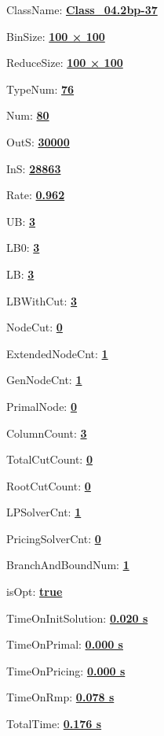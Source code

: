 \documentclass[11pt]{article}
\begin{document}
\pagestyle{empty}


ClassName: \underline{\textbf{Class_04.2bp-37}}
\par
BinSize: \underline{\textbf{100 × 100}}
\par
ReduceSize: \underline{\textbf{100 × 100}}
\par
TypeNum: \underline{\textbf{76}}
\par
Num: \underline{\textbf{80}}
\par
OutS: \underline{\textbf{30000}}
\par
InS: \underline{\textbf{28863}}
\par
Rate: \underline{\textbf{0.962}}
\par
UB: \underline{\textbf{3}}
\par
LB0: \underline{\textbf{3}}
\par
LB: \underline{\textbf{3}}
\par
LBWithCut: \underline{\textbf{3}}
\par
NodeCut: \underline{\textbf{0}}
\par
ExtendedNodeCnt: \underline{\textbf{1}}
\par
GenNodeCnt: \underline{\textbf{1}}
\par
PrimalNode: \underline{\textbf{0}}
\par
ColumnCount: \underline{\textbf{3}}
\par
TotalCutCount: \underline{\textbf{0}}
\par
RootCutCount: \underline{\textbf{0}}
\par
LPSolverCnt: \underline{\textbf{1}}
\par
PricingSolverCnt: \underline{\textbf{0}}
\par
BranchAndBoundNum: \underline{\textbf{1}}
\par
isOpt: \underline{\textbf{true}}
\par
TimeOnInitSolution: \underline{\textbf{0.020 s}}
\par
TimeOnPrimal: \underline{\textbf{0.000 s}}
\par
TimeOnPricing: \underline{\textbf{0.000 s}}
\par
TimeOnRmp: \underline{\textbf{0.078 s}}
\par
TotalTime: \underline{\textbf{0.176 s}}
\par
\newpage
\end{document}
